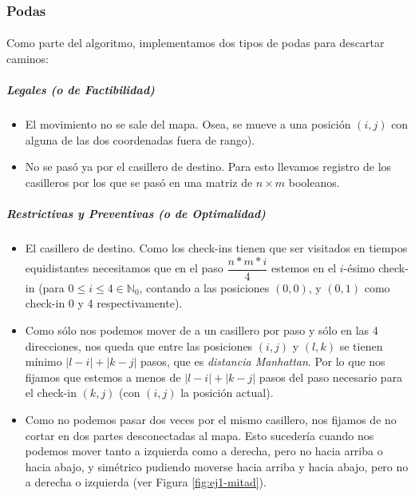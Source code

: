 \documentclass[./main.tex]{subfiles}
\begin{document}
\subsubsection{Podas}
\label{sec:ej1-podas}

\paragraph{} Como parte del algoritmo, implementamos dos tipos de podas para descartar caminos:
\subparagraph{Legales (o de Factibilidad)}
\begin{itemize}
  \item El movimiento no se sale del mapa. Osea, se mueve a una posición \((i, j)\) con alguna de las dos coordenadas fuera de rango).
  \item No se pasó ya por el casillero de destino. Para esto llevamos registro de los casilleros por los que se pasó en una matriz de \(n \times m\) booleanos.
\end{itemize}

\subparagraph{Restrictivas y Preventivas (o de Optimalidad)}
\begin{itemize}
  \item El casillero de destino. Como los check-ins tienen que ser visitados en tiempos equidistantes necesitamos que en el paso \(\dfrac{n*m*i}{4}\) estemos en el \(i\)-ésimo check-in (para \(0 \leq i \leq 4 \in \mathbb{N}_0\), contando a las posiciones \((0, 0)\), y \((0, 1)\) como check-in 0 y 4 respectivamente).
  \item Como sólo nos podemos mover de a un casillero por paso y sólo en las 4 direcciones, nos queda que entre las posiciones \((i, j)\) y \((l, k)\) se tienen mínimo \(|l-i| + |k-j|\) pasos, que es \textit{distancia Manhattan}. Por lo que nos fijamos que estemos a menos de \(|l-i| + |k-j|\) pasos del paso necesario para el check-in \((k, j)\) (con \((i, j)\) la posición actual).
  \item Como no podemos pasar dos veces por el mismo casillero, nos fijamos de no cortar en dos partes desconectadas al mapa. Esto sucedería cuando nos podemos mover tanto a izquierda como a derecha, pero no hacia arriba o hacia abajo, y simétrico pudiendo moverse hacia arriba y hacia abajo, pero no a derecha o izquierda (ver Figura \ref{fig:ej1-mitad}).
\end{itemize}
\end{document}
